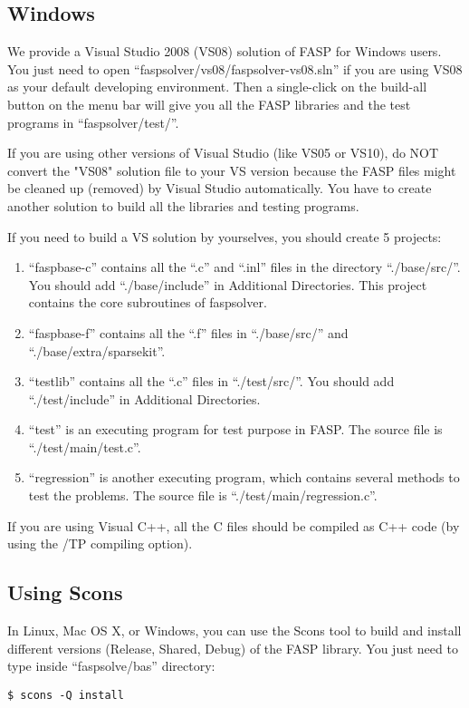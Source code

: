 \documentclass[11pt]{memoir}
\begin{document}
\subsection{Windows}

We provide a Visual Studio 2008 (VS08) solution of FASP for Windows users. You just need to open ``faspsolver/vs08/faspsolver-vs08.sln'' if you are using VS08 as your default developing environment. Then a single-click on the build-all button on the menu bar will give you all the FASP libraries and the test programs in ``faspsolver/test/''.

\begin{snugshade}\noindent
If you are using other versions of Visual Studio (like VS05 or VS10), do NOT convert the "VS08" solution file to your VS version because the FASP files might be cleaned up (removed) by Visual Studio automatically. You have to create another solution to build all the libraries and testing programs.
\end{snugshade}

If you need to build a VS solution by yourselves, you should create 5 projects:
\begin{enumerate}
\item ``faspbase-c'' contains all the ``.c'' and ``.inl'' files in the directory ``./base/src/''. You should add ``./base/include'' in Additional Directories. This project contains the core subroutines of faspsolver. 
\item ``faspbase-f'' contains all the ``.f'' files in ``./base/src/'' and ``./base/extra/sparsekit''. 
\item ``testlib'' contains all the ``.c'' files in ``./test/src/''. You should add ``./test/include'' in Additional Directories.
\item ``test'' is an executing program for test purpose in FASP. The source file is ``./test/main/test.c''.
\item ``regression'' is another executing program, which contains several methods to test the problems. The source file is ``./test/main/regression.c''.
\end{enumerate}

\begin{snugshade}\noindent
If you are using Visual C++, all the C files should be compiled as C++ code (by using the /TP compiling option).
\end{snugshade}

\subsection{Using Scons}
In Linux, Mac OS X, or Windows, you can use the Scons tool to build and install different versions (Release, Shared, Debug) of the FASP library. You just need to type inside ``faspsolve/bas'' directory:
%
\begin{lstlisting}[numbers=none]
$ scons -Q install
\end{lstlisting}
\end{document}
